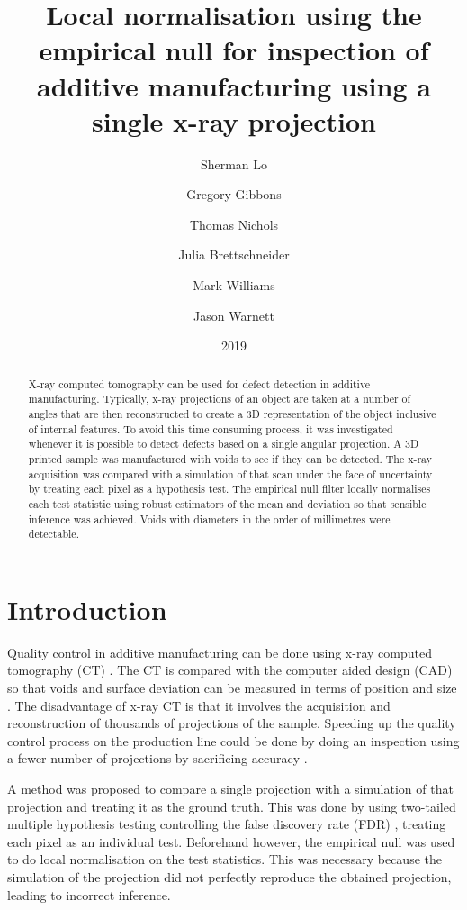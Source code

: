 \documentclass{proc}
\title{Local normalisation using the empirical null for inspection of additive manufacturing using a single x-ray projection}
\date{2019}
\author{
  Sherman Lo \and Gregory Gibbons \and Thomas Nichols \and Julia Brettschneider \and Mark Williams \and Jason Warnett
}
\begin{document}
\sloppy

\maketitle

\begin{abstract}
X-ray computed tomography can be used for defect detection in additive manufacturing. Typically, x-ray projections of an object are taken at a number of angles that are then reconstructed to create a 3D representation of the object inclusive of internal features. To avoid this time consuming process, it was investigated whenever it is possible to detect defects based on a single angular projection. A 3D printed sample was manufactured with voids to see if they can be detected. The x-ray acquisition was compared with a simulation of that scan under the face of uncertainty by treating each pixel as a hypothesis test. The empirical null filter locally normalises each test statistic using robust estimators of the mean and deviation so that sensible inference was achieved. Voids with diameters in the order of millimetres were detectable.
\end{abstract}

\section{Introduction}

Quality control in additive manufacturing can be done using x-ray computed tomography (CT) \citep{thompson2016x}. The CT is compared with the computer aided design (CAD) so that voids and surface deviation can be measured in terms of position and size \citep{villarraga2015assessing, lee2015compliance, kim2016inspection}. The disadvantage of x-ray CT is that it involves the acquisition and reconstruction of thousands of projections of the sample. Speeding up the quality control process on the production line could be done by doing an inspection using a fewer number of projections by sacrificing accuracy \citep{warnett2016towards, brierley2018optimized}.

A method was proposed to compare a single projection with a simulation of that projection and treating it as the ground truth. This was done by using two-tailed multiple hypothesis testing \citep{pearson1900on, neyman1933on, fisher1970statistical} controlling the false discovery rate (FDR) \citep{benjamini1995controlling, benjamini2010discovering}, treating each pixel as an individual test. Beforehand however, the empirical null \citep{efron2004large} was used to do local normalisation on the test statistics. This was necessary because the simulation of the projection did not perfectly reproduce the obtained projection, leading to incorrect inference.
\end{document}

